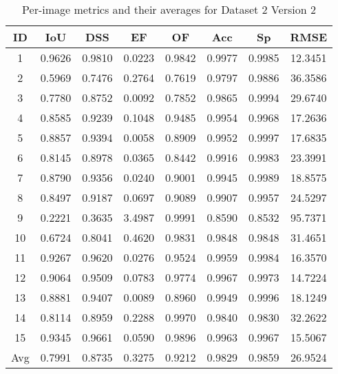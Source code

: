 \documentclass[12pt]{article}
\begin{document}
\begin{table}[h]
\centering
\begin{tabular}{|c|c|c|c|c|c|c|c|}
\hline
ID & IoU & DSS & EF & OF & Acc & Sp & RMSE \\
\hline
1 & 0.9626 & 0.9810 & 0.0223 & 0.9842 & 0.9977 & 0.9985 & 12.3451 \\
2 & 0.5969 & 0.7476 & 0.2764 & 0.7619 & 0.9797 & 0.9886 & 36.3586 \\
3 & 0.7780 & 0.8752 & 0.0092 & 0.7852 & 0.9865 & 0.9994 & 29.6740 \\
4 & 0.8585 & 0.9239 & 0.1048 & 0.9485 & 0.9954 & 0.9968 & 17.2636 \\
5 & 0.8857 & 0.9394 & 0.0058 & 0.8909 & 0.9952 & 0.9997 & 17.6835 \\
6 & 0.8145 & 0.8978 & 0.0365 & 0.8442 & 0.9916 & 0.9983 & 23.3991 \\
7 & 0.8790 & 0.9356 & 0.0240 & 0.9001 & 0.9945 & 0.9989 & 18.8575 \\
8 & 0.8497 & 0.9187 & 0.0697 & 0.9089 & 0.9907 & 0.9957 & 24.5297 \\
9 & 0.2221 & 0.3635 & 3.4987 & 0.9991 & 0.8590 & 0.8532 & 95.7371 \\
10 & 0.6724 & 0.8041 & 0.4620 & 0.9831 & 0.9848 & 0.9848 & 31.4651 \\
11 & 0.9267 & 0.9620 & 0.0276 & 0.9524 & 0.9959 & 0.9984 & 16.3570 \\
12 & 0.9064 & 0.9509 & 0.0783 & 0.9774 & 0.9967 & 0.9973 & 14.7224 \\
13 & 0.8881 & 0.9407 & 0.0089 & 0.8960 & 0.9949 & 0.9996 & 18.1249 \\
14 & 0.8114 & 0.8959 & 0.2288 & 0.9970 & 0.9840 & 0.9830 & 32.2622 \\
15 & 0.9345 & 0.9661 & 0.0590 & 0.9896 & 0.9963 & 0.9967 & 15.5067 \\
\hline
Avg & 0.7991 & 0.8735 & 0.3275 & 0.9212 & 0.9829 & 0.9859 & 26.9524 \\
\hline
\end{tabular}
\caption{Per-image metrics and their averages for Dataset 2 Version 2}
\end{table}
\end{document}
